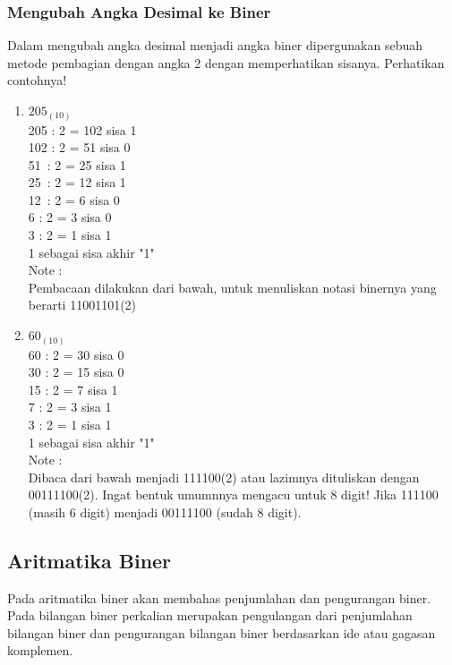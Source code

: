 \begin{enumerate}[label=(\alph*)]
\subsubsection {Mengubah Angka Desimal ke Biner} 

\qquad Dalam mengubah angka desimal menjadi angka biner dipergunakan sebuah metode pembagian dengan angka 2 dengan memperhatikan sisanya. 
Perhatikan contohnya! 
\begin{enumerate}
\item $205_{(10)}$\\
205 : 2 = 102 sisa 1\\ 
102 : 2 = 51 sisa 0 \\
51 \,: 2 = 25 sisa 1\\
25 \,: 2 = 12 sisa 1 \\
12 \,: 2 = 6 sisa 0 \\
6 \quad : 2 = 3 sisa 0 \\
3 \quad : 2 = 1 sisa 1 \\
1 \textrightarrow sebagai sisa akhir "1"\\

Note :\\
Pembacaan dilakukan dari bawah, untuk menuliskan notasi binernya yang berarti 11001101(2) \\

\item $60_{(10)}$\\
60 : 2 = 30 sisa 0\\ 
30 : 2 = 15 sisa 0 \\
15 : 2 = 7 sisa 1 \\
7 \: : 2 = 3 sisa 1 \\
3 \: : 2 = 1 sisa 1 \\
1 \textrightarrow sebagai sisa akhir "1"\\

Note :\\
Dibaca dari bawah menjadi 111100(2) atau lazimnya dituliskan dengan 00111100(2). Ingat bentuk umumnnya mengacu untuk 8 digit! Jika 111100 (masih 6 digit) menjadi 00111100 (sudah 8 digit).

\end{enumerate}

\subsection{Aritmatika Biner}

\qquad Pada aritmatika biner akan membahas penjumlahan dan pengurangan biner. Pada bilangan biner perkalian merupakan pengulangan dari penjumlahan bilangan biner dan pengurangan bilangan biner berdasarkan ide atau gagasan komplemen.


\end{enumerate}
